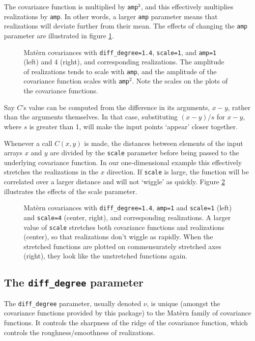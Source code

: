 The covariance function is multiplied by \texttt{amp}$^\texttt{2}$, and this effectively multiplies realizations by \texttt{amp}. In other words, a larger \texttt{amp} parameter means that realizations will deviate further from their mean. The effects of changing the \texttt{amp} parameter are illustrated in figure \ref{fig:amp}.
\begin{figure}
    \centering
    \caption{Mat\`ern covariances with \texttt{diff_degree=1.4}, \texttt{scale=1}, and \texttt{amp=1} (left) and 4 (right), and corresponding realizations. The amplitude of realizations tends to scale with \texttt{amp}, and the amplitude of the covariance function scales with \texttt{amp}$^2$. Note the scales on the plots of the covariance functions.}
    \label{fig:amp}
\end{figure}

Say $C$'s value can be computed from the difference in its arguments, $x-y$, rather than the arguments themselves. In that case, substituting $(x-y)/s$ for $x-y$, where $s$ is greater than 1, will make the input points `appear' closer together.

Whenever a call $C(x,y)$ is made, the distances between elements of the input arrays $x$ and $y$ are divided by the \texttt{scale} parameter before being passed to the underlying covariance function. In our one-dimensional example this effectively stretches the realizations in the $x$ direction. If \texttt{scale} is large, the function will be correlated over a larger distance and will not `wiggle' as quickly. Figure \ref{fig:scale} illustrates the effects of the scale parameter.
\begin{figure}
    \centering
    \caption{Mat\`ern covariances with \texttt{diff_degree=1.4}, \texttt{amp=1} and \texttt{scale=1} (left) and \texttt{scale=4} (center, right), and corresponding realizations. A larger value of \texttt{scale} stretches both covariance functions and realizations (center), so that realizations don't wiggle as rapidly. When the stretched functions are plotted on commensurately stretched axes (right), they look like the unstretched functions again.}
    \label{fig:scale}
\end{figure}

\subsection{The \texttt{diff_degree} parameter}\label{sub:diffdegree}
The \texttt{diff_degree} parameter, usually denoted $\nu$, is unique (amongst the covariance functions provided by this package) to the Mat\`ern family of covariance functions. It controls the sharpness of the ridge of the covariance function, which controls the roughness/smoothness of realizations.

